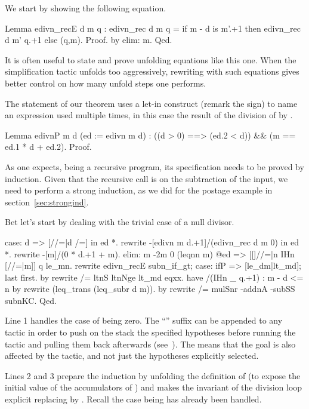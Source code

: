 We start by showing the following equation.

\begin{coq}{}{}
Lemma edivn_recE d m q :
 edivn_rec d m q = if m - d is m'.+1 then edivn_rec d m' q.+1 else (q,m).
Proof. by elim: m. Qed.
\end{coq}
It is often useful to state and prove unfolding equations like this one.
When the simplification tactic \C{/=} unfolds too aggressively,
rewriting with such equations gives better control on how many
unfold steps one performs.

The statement of our theorem
uses a let-in construct (remark the \C{:=} sign)
to name an expression used multiple
times, in this case the result of the division of  by .

\begin{coq}{}{}
Lemma edivnP m d (ed := edivn m d) :
  ((d > 0) ==> (ed.2 < d)) && (m == ed.1 * d + ed.2).
Proof.
\end{coq}

As one expects,  being a recursive program, its specification
needs to be proved by induction.  Given that the recursive call is on
the subtraction of the input, we need to perform a strong induction,
as we did for the postage example in section~\ref{sec:strongind}.

Bet let's start by dealing with the trivial case of a null divisor.

\begin{coq}{}{}
case: d => [//=|d /=] in ed *.
rewrite -[edivn m d.+1]/(edivn_rec d m 0) in ed *.
rewrite -[m]/(0 * d.+1 + m).
elim: m {-2}m 0 (leqnn m) @ed => [[]//=|n IHn [//=|m]] q le_mn.
rewrite edivn_recE subn_if_gt; case: ifP => [le_dm|lt_md]; last first.
  by rewrite /= ltnS ltnNge lt_md eqxx.
have /(IHn _ q.+1) : m - d <= n by rewrite (leq_trans (leq_subr d m)).
by rewrite /= mulSnr -addnA -subSS subnKC.
Qed.
\end{coq}
Line 1 handles the case of  being zero.  The ``'' suffix
can be appended to any tactic in order to push on the stack the specified
hypotheses before running the tactic and pulling
them back afterwards (see~\cite[section 6.5]{ssrman}).
The \C{*} means that the goal is also affected by the tactic, and not just
the hypotheses explicitly selected.

Lines 2 and 3 prepare the induction by unfolding the definition of
 (to expose the initial value of the accumulators of )
and makes the invariant of the division loop explicit replacing
 by .  Recall the case  being  has
already been handled.

